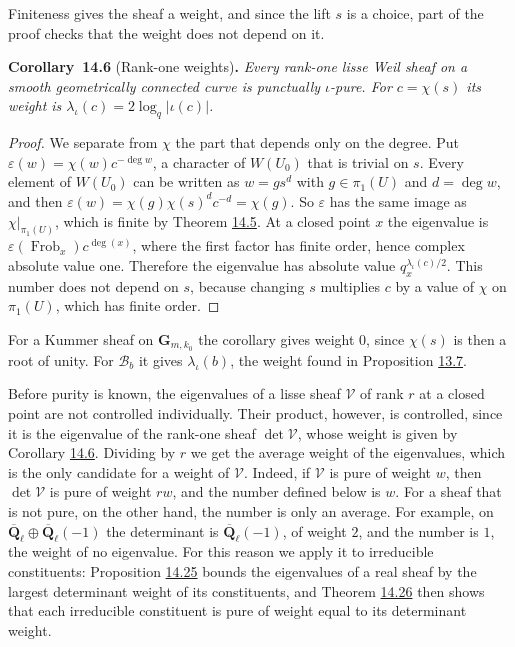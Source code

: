 \documentclass[11pt]{article}
\newenvironment{bpstatement}[2]{\par\addvspace{0.6\baselineskip}\noindent\textbf{#1}#2\textbf{.}\enspace\ignorespaces}
  {\par\addvspace{0.4\baselineskip}}
\newenvironment{bpstatementit}[2]{\begin{bpstatement}{#1}{#2}\itshape\ignorespaces}{\end{bpstatement}}
\begin{document}
\label{bp60}%
Finiteness gives the sheaf a weight, and since the lift \(s\) is a choice, part of the proof checks that the weight does not depend on it.

\label{bp61}%
\begin{bpstatementit}{Corollary~14.6}{ (Rank-one weights)}
Every rank-one lisse Weil sheaf on a smooth geometrically connected curve is punctually \(\iota\)-pure.  For \(c=\chi(s)\) its weight is \(\lambda_\iota(c)=2\log_q|\iota(c)|\).
\end{bpstatementit}

\begin{proof}[{Proof}]\label{bp62}%
We separate from \(\chi\) the part that depends only on the degree. Put \(\varepsilon(w)=\chi(w)c^{-\deg w}\), a character of \(W(U_0)\) that is trivial on \(s\).  Every element of \(W(U_0)\) can be written as \(w=gs^d\) with \(g\in\pi_1(U)\) and \(d=\deg w\), and then \(\varepsilon(w)=\chi(g)\chi(s)^dc^{-d}=\chi(g)\). So \(\varepsilon\) has the same image as \(\chi|_{\pi_1(U)}\), which is finite by Theorem \hyperref[bp58]{14.5}.  At a closed point \(x\) the eigenvalue is \(\varepsilon(\operatorname{Frob}_x)c^{\deg(x)}\), where the first factor has finite order, hence complex absolute value one. Therefore the eigenvalue has absolute value \(q_x^{\lambda_\iota(c)/2}\).  This number does not depend on \(s\), because changing \(s\) multiplies \(c\) by a value of \(\chi\) on \(\pi_1(U)\), which has finite order.
\end{proof}

\label{bp63}%
For a Kummer sheaf on \(\mathbf G_{m,k_0}\) the corollary gives weight \(0\), since \(\chi(s)\) is then a root of unity. For \(\mathcal B_b\) it gives \(\lambda_\iota(b)\), the weight found in Proposition \hyperref[bp24]{13.7}.

Before purity is known, the eigenvalues of a lisse sheaf \(\mathcal V\) of rank \(r\) at a closed point are not controlled individually. Their product, however, is controlled, since it is the eigenvalue of the rank-one sheaf \(\det\mathcal V\), whose weight is given by Corollary \hyperref[bp61]{14.6}. Dividing by \(r\) we get the average weight of the eigenvalues, which is the only candidate for a weight of \(\mathcal V\). Indeed, if \(\mathcal V\) is pure of weight \(w\), then \(\det\mathcal V\) is pure of weight \(rw\), and the number defined below is \(w\). For a sheaf that is not pure, on the other hand, the number is only an average. For example, on \(\overline{\mathbf Q}_\ell\oplus\overline{\mathbf Q}_\ell(-1)\) the determinant is \(\overline{\mathbf Q}_\ell(-1)\), of weight \(2\), and the number is \(1\), the weight of no eigenvalue. For this reason we apply it to irreducible constituents: Proposition \hyperref[bp116]{14.25} bounds the eigenvalues of a real sheaf by the largest determinant weight of its constituents, and Theorem \hyperref[bp120]{14.26} then shows that each irreducible constituent is pure of weight equal to its determinant weight.
\end{document}
